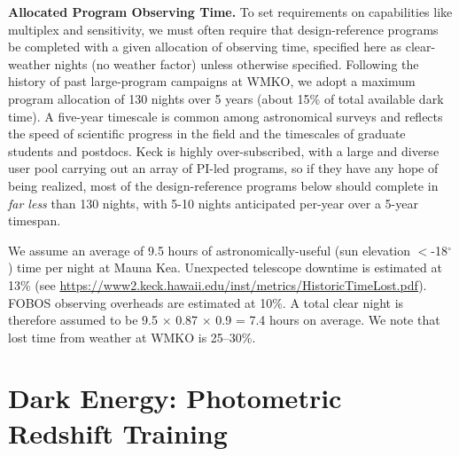 \documentclass[11pt,a4paper,twoside,onecolumn,openany,final,oldfontcommands]{memoir}
\begin{document}
\noindent \textbf{Allocated Program Observing Time.}  To set requirements on capabilities like multiplex and sensitivity, we must often require that design-reference programs be completed with a given allocation of observing time, specified here as clear-weather nights (no weather factor) unless otherwise specified.  Following the history of past large-program campaigns at WMKO, we adopt a maximum program allocation of 130 nights over 5 years (about 15\% of total available dark time).  A five-year timescale is common among astronomical surveys and reflects the speed of scientific progress in the field and the timescales of graduate students and postdocs.  Keck is highly over-subscribed, with a large and diverse user pool carrying out an array of PI-led programs, so if they have any hope of being realized, most of the design-reference programs below should complete in \emph{far less} than 130 nights, with 5-10 nights anticipated per-year over a 5-year timespan.  

We assume an average of 9.5 hours of astronomically-useful (sun elevation $<$-18$^\circ$) time per night at Mauna Kea.  Unexpected telescope downtime is estimated at 13\% (see \url{https://www2.keck.hawaii.edu/inst/metrics/HistoricTimeLost.pdf}).  FOBOS observing overheads are estimated at 10\%.  A total clear night is therefore assumed to be 9.5 $\times$ 0.87 $\times$ 0.9 = 7.4 hours on average.  We note that lost time from weather at WMKO is 25--30\%.  


\section{Dark Energy: Photometric Redshift Training}
\label{sec:photozs}
\end{document}
